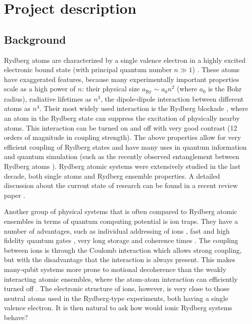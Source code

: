 \section{Project description}

\subsection{Background}

Rydberg atoms are characterized by a single valence electron in a highly excited electronic bound state (with principal quantum number $n \gg 1$) \cite{Gallagher1994}. These atoms have exaggerated features, because many experimentally important properties scale as a high power of $n$: their physical size $a_\mathrm{Ry} \sim a_0 n^2$ (where $a_0$ is the Bohr radius), radiative lifetimes as $n^3$, the dipole-dipole interaction between different atoms as $n^4$. Their most widely used interaction is the Rydberg blockade \cite{Jaksch2000}, where an atom in the Rydberg state can suppress the excitation of physically nearby atoms. This interaction can be turned on and off with very good contrast (12 orders of magnitude in coupling strength). The above properties allow for very efficient coupling of Rydberg states and have many uses in quantum information and quantum simulation (such as the recently observed entanglement between Rydberg atoms \cite{Wilk2010}). Rydberg atomic systems were extensively studied in the last decade, both single atoms and Rydberg ensemble properties. A detailed discussion about the current state of research can be found in a recent review paper \cite{Saffman2010}.

Another group of physical systems that is often compared to Rydberg atomic ensembles in terms of quantum computing potential is ion traps. They have a number of advantages, such as individual addressing of ions \cite{Nagerl1999}, fast and high fidelity quantum gates \cite{Benhelm2008}, very long storage and coherence times \cite{Lucas2007}. The coupling between ions is through the Coulomb interaction which allows strong coupling, but with the disadvantage that the interaction is always present. This makes many-qubit systems more prone to motional decoherence than the weakly interacting atomic ensembles, where the atom-atom interaction can efficiently turned off . The electronic structure of ions, however, is very close to those neutral atoms used in the Rydberg-type experiments, both having a single valence electron. It is then natural to ask how would ionic Rydberg systems behave?

